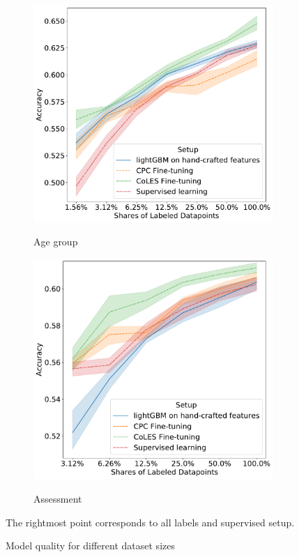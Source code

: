 \documentclass{article}
\begin{document}
\begin{figure}
  \centering
  \begin{subfigure}[t]{0.49\linewidth}
    \caption{Age group}
    \includegraphics[width=\linewidth]{figures/ss_age_pred_per.pdf}
    \label{fig-semi-age}
  \end{subfigure}
  \hfill%
  \begin{subfigure}[t]{0.49\linewidth}
    \caption{Assessment}
    \includegraphics[width=\linewidth]{figures/ss_bowl2019_per.pdf}
    \label{fig-semi-assessment}
  \end{subfigure}%
  \caption{Model quality for different dataset sizes}
    \small{The rightmost point corresponds to all labels and supervised setup.}
  \label{fig-semi-main}
\end{figure}
\end{document}
